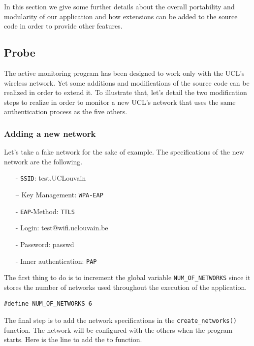 In this section we give some further details about the overall portability and modularity of our application and how extensions can be added to the source code in order to provide other features.



\subsection{Probe}
The active monitoring program has been designed to work only with the UCL's wireless network. Yet some additions and modifications of the source code can be realized in order to extend it. To illustrate that, let's detail the two modification steps to realize in order to monitor a new UCL's network that uses the same authentication process as the five others.

\subsubsection*{Adding a new network}
Let's take a fake network for the sake of example. The specifications of the new network are the following.

\begin{itemize}
	\item [-] \texttt{SSID}: test.UCLouvain
	\item [–] Key Management: \texttt{WPA-EAP}
	\item [-] \texttt{EAP}-Method: \texttt{TTLS}
	\item [-] Login: test@wifi.uclouvain.be
	\item [-] Password: passwd
	\item [-] Inner authentication: \texttt{PAP}
\end{itemize}

The first thing to do is to increment the global variable \texttt{NUM\_OF\_NETWORKS} since it stores the number of networks used throughout the execution of the application.\\

\begin{lstlisting}[frame=single,breaklines=true,caption={Small log file example}]
#define NUM_OF_NETWORKS 6
\end{lstlisting}

The final step is to add the network specifications in the \texttt{create\_networks()} function. The network will be configured with the others when the program starts. Here is the line to add the to function.\\

